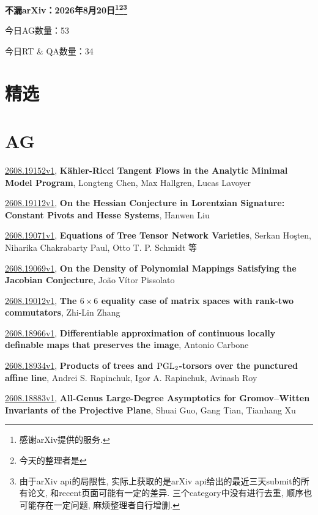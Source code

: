\documentclass[9pt, a4paper]{article}
\theoremstyle{plain}
\theoremstyle{definition}
\theoremstyle{remark}
\newcommand{\arxiv}[3]{\href{https://arxiv.org/abs/#1}{#1}, \textbf{\textcolor{arxivblue}{#2}}, #3}
\newcommand{\AGnumber}{53}
\newcommand{\RTQAnumber}{34}
\newcommand{\NewestDate}{2026年8月20日}
\newcommand{\todayarXiver}{} %
\begin{document}
\begin{center}
    \Huge\textbf{不漏arXiv：\NewestDate\footnote{感谢arXiv提供的服务.}\footnote{今天的整理者是\todayarXiver}\footnote{由于arXiv api的局限性, 实际上获取的是arXiv api给出的最近三天submit的所有论文, 和recent页面可能有一定的差异. 三个category中没有进行去重, 顺序也可能存在一定问题, 麻烦整理者自行增删.}} \\
\end{center}

\setcounter{section}{-1}

\begin{center}
    今日AG数量：\AGnumber
    
    今日RT \& QA数量：\RTQAnumber
    
\end{center}


\section{精选}


\section{AG}
\arxiv{2608.19152v1}{Kähler-Ricci Tangent Flows in the Analytic Minimal Model Program}{Longteng Chen, Max Hallgren, Lucas Lavoyer}

\arxiv{2608.19112v1}{On the Hessian Conjecture in Lorentzian Signature: Constant Pivots and Hesse Systems}{Hanwen Liu}

\arxiv{2608.19071v1}{Equations of Tree Tensor Network Varieties}{Serkan Hoşten, Niharika Chakrabarty Paul, Otto T. P. Schmidt 等}

\arxiv{2608.19069v1}{On the Density of Polynomial Mappings Satisfying the Jacobian Conjecture}{João Vítor Pissolato}

\arxiv{2608.19012v1}{The $6\times6$ equality case of matrix spaces with rank-two commutators}{Zhi-Lin Zhang}

\arxiv{2608.18966v1}{Differentiable approximation of continuous locally definable maps that preserves the image}{Antonio Carbone}

\arxiv{2608.18934v1}{Products of trees and ${\rm PGL}_2$-torsors over the punctured affine line}{Andrei S. Rapinchuk, Igor A. Rapinchuk, Avinash Roy}

\arxiv{2608.18883v1}{All-Genus Large-Degree Asymptotics for Gromov--Witten Invariants of the Projective Plane}{Shuai Guo, Gang Tian, Tianhang Xu}
\end{document}
